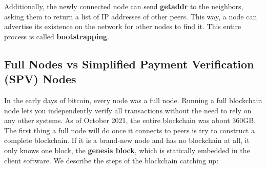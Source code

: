 \documentclass{article}
\begin{document}
    Additionally, the newly connected node can send \textbf{getaddr} to the neighbors, asking them to return a list of IP addresses of other peers. This way, a node can advertise its existence on the network for other nodes to find it. This entire process is called \textbf{bootstrapping}.

  \subsection{Full Nodes vs Simplified Payment Verification (SPV) Nodes}

    In the early days of bitcoin, every node was a full node. Running a full blockchain node lets you independently verify all transactions without the need to rely on any other systems. As of October 2021, the entire blockchain was about 360GB. The first thing a full node will do once it connects to peers is try to construct a complete blockchain. If it is a brand-new node and has no blockchain at all, it only knows one block, the \textbf{genesis block}, which is statically embedded in the client software. We describe the steps of the blockchain catching up:
\end{document}
